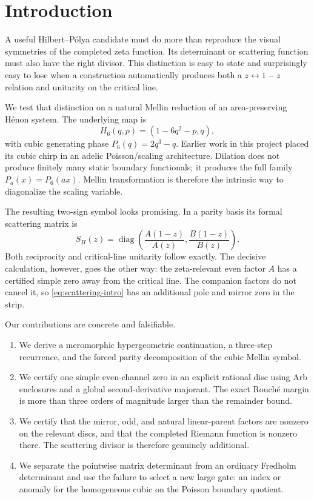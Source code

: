 \section{Introduction}

A useful Hilbert--P\'olya candidate must do more than reproduce the visual
symmetries of the completed zeta function. Its determinant or scattering
function must also have the right divisor. This distinction is easy to
state and surprisingly easy to lose when a construction automatically
produces both a $z\leftrightarrow1-z$ relation and unitarity on the critical
line.

We test that distinction on a natural Mellin reduction of an
area-preserving H\'enon system. The underlying map is
\begin{equation}\label{eq:h6}
H_6(q,p)=(1-6q^2-p,q),
\end{equation}
with cubic generating phase $P_6(q)=2q^3-q$. Earlier work in this project
placed its cubic chirp in an adelic Poisson/scaling architecture. Dilation
does not produce finitely many static boundary functionals; it produces the
full family $P_a(x)=P_6(ax)$. Mellin transformation is therefore the
intrinsic way to diagonalize the scaling variable.

The resulting two-sign symbol looks promising. In a parity basis its formal
scattering matrix is
\begin{equation}\label{eq:scattering-intro}
S_H(z)=\operatorname{diag}\left(
\frac{A(1-z)}{A(z)},\frac{B(1-z)}{B(z)}
\right).
\end{equation}
Both reciprocity and critical-line unitarity follow exactly. The decisive
calculation, however, goes the other way: the zeta-relevant even factor
$A$ has a certified simple zero away from the critical line. The companion
factors do not cancel it, so \eqref{eq:scattering-intro} has an additional
pole and mirror zero in the strip.

Our contributions are concrete and falsifiable.
\begin{enumerate}[leftmargin=*]
\item We derive a meromorphic hypergeometric continuation, a three-step
recurrence, and the forced parity decomposition of the cubic Mellin symbol.
\item We certify one simple even-channel zero in an explicit rational disc
using Arb enclosures and a global second-derivative majorant. The exact
Rouch\'e margin is more than three orders of magnitude larger than the
remainder bound.
\item We certify that the mirror, odd, and natural linear-parent factors are
nonzero on the relevant discs, and that the completed Riemann function is
nonzero there. The scattering divisor is therefore genuinely additional.
\item We separate the pointwise matrix determinant from an ordinary Fredholm
determinant and use the failure to select a new large gate: an index or
anomaly for the homogeneous cubic on the Poisson boundary quotient.
\end{enumerate}

